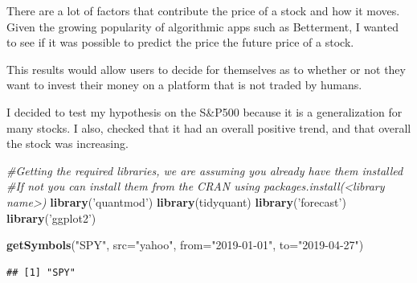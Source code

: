 \documentclass[]{article}
\newenvironment{Shaded}{\begin{snugshade}}{\end{snugshade}}
\newcommand{\CommentTok}[1]{\textcolor[rgb]{0.56,0.35,0.01}{\textit{#1}}}
\newcommand{\DataTypeTok}[1]{\textcolor[rgb]{0.13,0.29,0.53}{#1}}
\newcommand{\KeywordTok}[1]{\textcolor[rgb]{0.13,0.29,0.53}{\textbf{#1}}}
\newcommand{\NormalTok}[1]{#1}
\newcommand{\StringTok}[1]{\textcolor[rgb]{0.31,0.60,0.02}{#1}}
\begin{document}
There are a lot of factors that contribute the price of a stock and how
it moves. Given the growing popularity of algorithmic apps such as
Betterment, I wanted to see if it was possible to predict the price the
future price of a stock.

This results would allow users to decide for themselves as to whether or
not they want to invest their money on a platform that is not traded by
humans.

I decided to test my hypothesis on the S\&P500 because it is a
generalization for many stocks. I also, checked that it had an overall
positive trend, and that overall the stock was increasing.

\begin{Shaded}
\begin{Highlighting}[]
\CommentTok{#Getting the required libraries, we are assuming you already have them installed }
\CommentTok{#If not you can install them from the CRAN using packages.install(<library name>)}
\KeywordTok{library}\NormalTok{(}\StringTok{'quantmod'}\NormalTok{)}
\KeywordTok{library}\NormalTok{(tidyquant)}
\KeywordTok{library}\NormalTok{(}\StringTok{'forecast'}\NormalTok{)}
\KeywordTok{library}\NormalTok{(}\StringTok{'ggplot2'}\NormalTok{)}

\KeywordTok{getSymbols}\NormalTok{(}\StringTok{"SPY"}\NormalTok{, }\DataTypeTok{src=}\StringTok{"yahoo"}\NormalTok{, }\DataTypeTok{from=}\StringTok{"2019-01-01"}\NormalTok{, }\DataTypeTok{to=}\StringTok{"2019-04-27"}\NormalTok{)}
\end{Highlighting}
\end{Shaded}

\begin{verbatim}
## [1] "SPY"
\end{verbatim}
\end{document}
